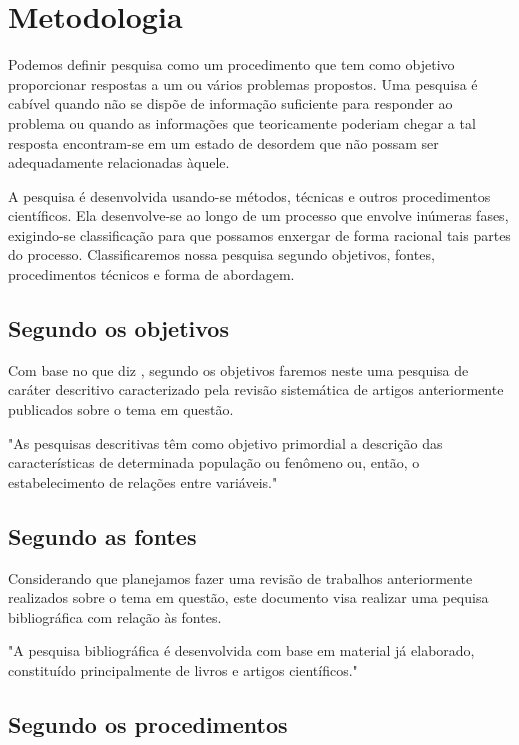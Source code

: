 \chapter{Metodologia}

Podemos definir pesquisa como um procedimento que tem como objetivo proporcionar respostas a um ou vários problemas propostos. Uma pesquisa é cabível quando não se dispõe de informação suficiente para responder ao problema ou quando as informações que teoricamente poderiam chegar a tal resposta encontram-se em um estado de desordem que não possam ser adequadamente relacionadas àquele.

A pesquisa é desenvolvida usando-se métodos, técnicas e outros procedimentos científicos. Ela desenvolve-se ao longo de um processo que envolve inúmeras fases, exigindo-se classificação para que possamos enxergar de forma racional tais partes do processo. Classificaremos nossa pesquisa segundo objetivos, fontes, procedimentos técnicos e forma de abordagem.

\section{Segundo os objetivos}

Com base no que diz \cite{AntonioCarlosGil}, segundo os objetivos faremos neste uma pesquisa de caráter descritivo caracterizado pela revisão sistemática de artigos anteriormente publicados sobre o tema em questão.

"As pesquisas descritivas têm como objetivo primordial a descrição das características de determinada população ou fenômeno ou, então, o estabelecimento de relações entre variáveis."\cite[p.44]{AntonioCarlosGil}

\section{Segundo as fontes}

Considerando que planejamos fazer uma revisão de trabalhos anteriormente realizados sobre o tema em questão, este documento visa realizar uma pequisa bibliográfica com relação às fontes.

"A pesquisa bibliográfica é desenvolvida com base em material já elaborado, constituído principalmente de livros e artigos científicos."\cite{AntonioCarlosGil}


\section{Segundo os procedimentos}


